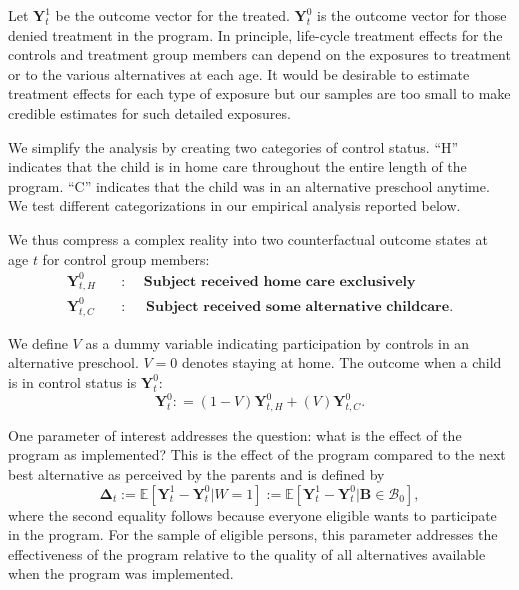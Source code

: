 Let $\bm{Y}^1_t$ be the outcome vector for the treated. $\bm{Y}^0_t$ is the outcome vector for those denied treatment in the program. In principle, life-cycle treatment effects for the controls and treatment group members can depend on the exposures to treatment or to the various alternatives at each age. It would be desirable to estimate treatment effects for each type of exposure but our samples are too small to make credible estimates for such detailed exposures.

We simplify the analysis by creating two categories of control status. ``H'' indicates that the child is in home care throughout the entire length of the program. ``C'' indicates that the child was in an alternative preschool anytime. We test different categorizations in our empirical analysis reported below.

We thus compress a complex reality into two counterfactual outcome states at age $t$ for control group members:
\begin{align*}
\bm{Y}_{t,H}^0 \quad &: \quad \textbf{ Subject received home care exclusively} \\
\bm{Y}_{t,C}^0 \quad &: \quad \textbf{ Subject received some alternative childcare}.
\end{align*}

We define $V$ as a dummy variable indicating participation by controls in an alternative preschool. $V=0$ denotes staying at home. The outcome when a child is in control status is $\bm{Y}^0_t$:
\begin{equation}
\bm{Y}^0_t : = \left( 1 - V \right) \bm{Y}^0_{t,H} + \left( V \right) \bm{Y}^0_{t,C}.
\end{equation}

One parameter of interest addresses the question: what is the effect of the program as implemented? This is the effect of the program compared to the next best alternative as perceived by the parents and is defined by
\begin{equation}\label{eq:effect}
\bm{\Delta}_t := \mathbb{E} \left[ \bm{Y}^1_t -  \bm{Y}^0_t | W =1 \right] := \mathbb{E} \left[\bm{Y}^1_t - \bm{Y}^0_t | \bm{B} \in \mathcal{B}_0 \right],
\end{equation}
where the second equality follows because everyone eligible wants to participate in the program. For the sample of eligible persons, this parameter addresses the effectiveness of the program relative to the quality of all alternatives available when the program was implemented.

